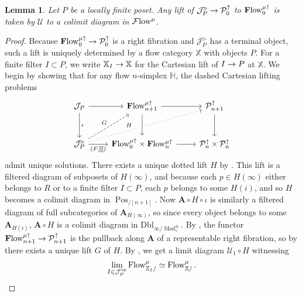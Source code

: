 \documentclass[10pt]{amsart}
\numberwithin{equation}{section}
\newtheorem{lem}[prop]{Lemma}
\theoremstyle{definition}
\DeclareMathOperator{\Mod}{Mod}
\DeclareMathOperator{\op}{op}
\DeclareMathOperator{\Pos}{Pos}
\newcommand{\Flow}{\cF\mathrm{low}\vphantom{w}}
\newcommand{\bfFlow}{\mathbf{F}\mathrm{low}\vphantom{w}}
\newcommand{\PreFlow}{\mathrm{Flow}\vphantom{w}}
\newcommand{\bfPreFlow}{\mathbf{F}\mathrm{low}\vphantom{w}}
\newcommand{\bH}{\mathbb{H}}
\newcommand{\bX}{\mathbb{X}}
\newcommand{\cJ}{\mathcal{J}}
\newcommand{\cP}{\mathcal{P}}
\newcommand{\cF}{\mathcal{F}}
\newcommand{\cU}{\mathcal{U}}
\newcommand{\bfA}{\mathbf{A}}
\newcommand{\Dbl}{\mathrm{Dbl}}
\renewcommand{\to}{\mathchoice{\longrightarrow}{\rightarrow}{}{}}
\begin{document}
\begin{lem}\label{lem:filtered_colim_lifting_condition}
	Let $P$ be a locally finite poset. Any lift of $\cJ_{P}^{\triangleright} \to \cP^{\uparrow}_{0}$  to $\bfPreFlow^{\mu\uparrow}_{0}$ is taken by $\cU$ to a colimit diagram in $\Flow^{\mu}$.
\end{lem}
\begin{proof}
	Because $\bfPreFlow^{\mu\uparrow}_{0}\to \cP_{0}^{\uparrow}$ is a right fibration and $\cJ_{P}^{\triangleright}$ has a terminal object, such a lift is uniquely determined by a flow category $\bX$ with objects $P$.
  For a finite filter $I\subset P$, we write $\bX_{I} \to \bX$ for the Cartesian lift of $I\to P$ at $\bX$.
  We begin by showing that for any flow $n$-simplex $\bH$, the dashed Cartesian lifting problems
	\begin{equation*}
		\begin{tikzcd}[row sep=6ex]
			\cJ_{P}
			\arrow[r]
			\arrow[d, "\iota"]    &
			\bfPreFlow^{\mu\uparrow}_{n+1}
			\arrow[r]     &
			\cP^{\uparrow}_{n+1}
			\arrow[d]     \\
			\cJ_{P}^{\triangleright}
			\arrow[r, "{\left(F,\underline{\bH} \right)}"']
			\arrow[ur, dashed, "G"]
			\arrow[urr, dotted, "H",pos=0.4]   &
			\bfPreFlow_{0}^{\mu\uparrow}\times\bfPreFlow_{n}^{\mu\uparrow}
			\arrow[r]    &
			\cP^{\uparrow}_{n}\times \cP^{\uparrow}_{n}
			\arrow[from=1-2,to=2-2, crossing over]
		\end{tikzcd}
	\end{equation*}
	admit unique solutions.
  There exists a unique dotted lift $H$ by .
  This lift is a filtered diagram of subposets of $H(\infty)$, and because each $p\in H(\infty)$ either belongs to $R$ or to a finite filter $I\subset P$, each $p$ belongs to some $H(i)$, and so $H$ becomes a colimit diagram in $\Pos_{/[n+1]}$.
  Now $\bfA\circ H\circ \iota$ is similarly a filtered diagram of full subcategories of $\bfA_{H(\infty)}$, so since every object belongs to some $\bfA_{ H(i)}$, $\bfA\circ H$ is a colimit diagram in $\Dbl_{\infty/\Mod_{\diamond}^{\otimes}}$.
  By , the functor $\bfFlow^{\mu\uparrow}_{n+1}\to \cP^{\uparrow}_{n+1}$ is the pullback along $\bfA$ of a representable right fibration, so by  there exists a unique lift $G$ of $H$.
  By , we get a limit diagram $\cU_{1}\circ H$ witnessing
	\begin{align*}
		\lim_{I \in \cJ_{P}^{\op}} \PreFlow^{\mu}_{\bX_{I}/} \simeq \PreFlow^{\mu}_{\bX/} \,.

\end{align*}
\end{proof}
\end{document}
